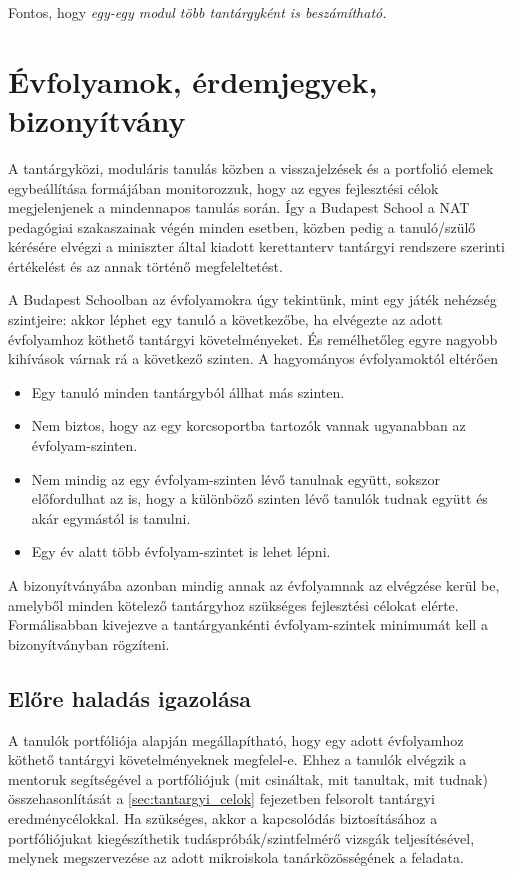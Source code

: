 Fontos, hogy \emph{egy-egy modul több tantárgyként is beszámítható.}

\section{Évfolyamok, érdemjegyek, bizonyítvány}

A tantárgyközi, moduláris tanulás közben a visszajelzések és a portfolió elemek egybeállítása formájában monitorozzuk, hogy az egyes fejlesztési célok megjelenjenek a mindennapos tanulás során. Így a Budapest School a NAT pedagógiai szakaszainak végén minden esetben, közben pedig a tanuló/szülő kérésére elvégzi a miniszter által kiadott kerettanterv tantárgyi rendszere szerinti értékelést és az annak történő megfeleltetést.

A Budapest Schoolban az évfolyamokra úgy tekintünk, mint egy játék nehézség szintjeire: akkor léphet egy tanuló a következőbe, ha elvégezte az adott évfolyamhoz köthető tantárgyi követelményeket. És remélhetőleg egyre nagyobb kihívások várnak rá a következő szinten. A hagyományos évfolyamoktól eltérően

\begin{itemize}
\item Egy tanuló minden tantárgyból állhat más szinten.
\item Nem biztos, hogy az egy korcsoportba tartozók vannak ugyanabban az évfolyam-szinten.
\item Nem mindig az egy évfolyam-szinten lévő tanulnak együtt, sokszor előfordulhat az is, hogy a különböző szinten lévő tanulók tudnak együtt és akár egymástól is tanulni.
\item Egy év alatt több évfolyam-szintet is lehet lépni.
\end{itemize}

 A bizonyítványába azonban mindig annak az évfolyamnak az elvégzése kerül be, amelyből minden kötelező tantárgyhoz szükséges fejlesztési célokat elérte. Formálisabban kivejezve a tantárgyankénti évfolyam-szintek minimumát kell a bizonyítványban rögzíteni.

\subsection{Előre haladás igazolása}
A tanulók portfóliója alapján megállapítható, hogy egy adott évfolyamhoz köthető tantárgyi követelményeknek megfelel-e. Ehhez a tanulók elvégzik a mentoruk segítségével a portfóliójuk (mit csináltak, mit tanultak, mit tudnak) összehasonlítását a \ref{sec:tantargyi_celok} fejezetben felsorolt tantárgyi eredménycélokkal. Ha szükséges, akkor a kapcsolódás biztosításához a portfóliójukat kiegészíthetik tudáspróbák/szintfelmérő vizsgák teljesítésével, melynek megszervezése az adott mikroiskola tanárközösségének a feladata.

